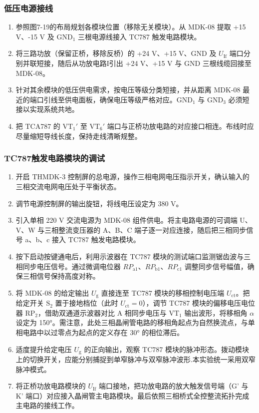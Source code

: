 \begin{framed}
{			\subsubsection{低压电源接线}
			\begin{enumerate}
				\item 参照图7-19的布局规划各模块位置（移除无关模块）。从 MDK-08 提取 +15 V、-15 V 及 $\text{GND}_1$ 三根电源线接入 TC787 触发电路模块。
				\item 将三路功放（保留正桥，移除反桥）的 +24 V、+15 V、GND 及 $U_\text{If}$ 端口分别并联短接，随后从功放电路I引出 +24 V、+15 V 与 GND 三根线缆回接至 MDK-08。
				\item 针对其余模块的低压供电需求，按电压等级分类短接，并从距离 MDK-08 最近的端口引线至供电面板，确保电压等级严格对应。$\text{GND}_1$ 与 $\text{GND}_3$ 必须短接以实现系统共地。
				\item 把 TCA787 的 $\text{VT}_1'$ 至 $\text{VT}_6'$ 端口与正桥功放电路的对应接口相连。布线时应尽量缩短导线长度，保持走线清晰规整。
			\end{enumerate}
			
			\subsubsection{TC787触发电路模块的调试}
			\begin{enumerate}
				\item 开启 THMDK-3 控制屏的总电源，操作三相电网电压指示开关，确认输入的三相交流电网电压处于平衡状态。
				\item 调节电源控制屏的输出旋钮，将线电压设定为 380 V。
				\item 引入单相 220 V 交流电源为 MDK-08 组件供电。将主电路电源的可调端 U、V、W 与三相整流变压器的 A、B、C 端子逐一对应连接，随后把三相同步信号 a、b、c 接入 TC787 触发电路模块。
				\item 按下启动按键通电后，利用示波器在 TC787 模块的测试端口监测锯齿波与三相同步电压信号。通过微调电位器 $RP_{\text{a1}}$、$RP_{\text{b1}}$、$RP_{\text{c1}}$ 调整同步信号幅值，确保三相信号保持高度对称。
				\item 将 MDK-08 的给定输出 $U_\text{g}$ 直接连至 TC787 模块的移相控制电压端 $U_\text{ct}$。把给定开关 $\text{S}_2$ 置于接地档位（此时 $U_\text{ct}=0$），调节 TC787 模块的偏移电压电位器 $\text{RP}_2$，借助双通道示波器对比 A 相同步电压与 $\text{VT}_1$ 输出波形，将移相角 $\alpha$ 设定为 150°。需注意，此处三相晶闸管电路的移相角起点为自然换流点，与单相电路中以过零点为起点的定义存在 30° 的相位滞后。
				\item 适度提升给定电压 $U_\text{g}$ 的正向输出，观察 TC787 模块的脉冲形态。拨动模块上的切换开关，应能分别捕捉到单窄脉冲与双窄脉冲波形.本实验统一采用双窄脉冲模式。
				\item 将正桥功放电路模块的 $U_\text{If}$ 端口接地，把功放电路的放大触发信号端（G' 与 K' 端口）对应接入晶闸管主电路模块。最后依照三相桥式全控整流拓扑完成主电路的接线工作。
			\end{enumerate}
			
}
\end{framed}
